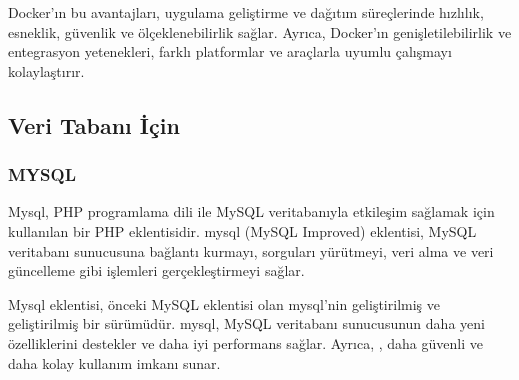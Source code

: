 Docker'ın bu avantajları, uygulama geliştirme ve dağıtım süreçlerinde hızlılık, esneklik, güvenlik ve ölçeklenebilirlik sağlar. Ayrıca, Docker'ın genişletilebilirlik ve entegrasyon yetenekleri, farklı platformlar ve araçlarla uyumlu çalışmayı kolaylaştırır.

\subsection{Veri Tabanı İçin }
\subsubsection{MYSQL}
Mysql, PHP programlama dili ile MySQL veritabanıyla etkileşim sağlamak için kullanılan bir PHP eklentisidir. mysql (MySQL Improved) eklentisi, MySQL veritabanı sunucusuna bağlantı kurmayı, sorguları yürütmeyi, veri alma ve veri güncelleme gibi işlemleri gerçekleştirmeyi sağlar.

Mysql  eklentisi, önceki MySQL eklentisi olan mysql'nin geliştirilmiş ve geliştirilmiş bir sürümüdür. mysql, MySQL veritabanı sunucusunun daha yeni özelliklerini destekler ve daha iyi performans sağlar. Ayrıca, , daha güvenli ve daha kolay kullanım imkanı sunar.

